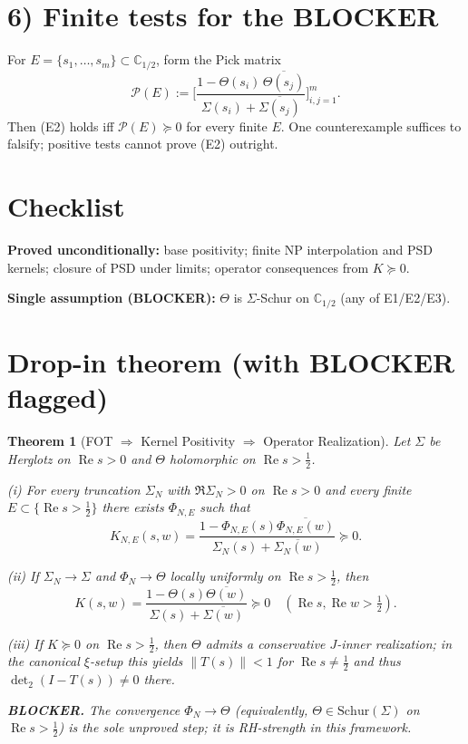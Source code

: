 \documentclass[11pt]{article}
\newcommand{\C}{\mathbb{C}}
\newcommand{\ReS}{\operatorname{Re}}
\newcommand{\Si}{\Sigma}
\newcommand{\SiN}{\Sigma_N}
\newcommand{\Th}{\Theta}
\newcommand{\detTwo}{\det\nolimits_{2}}
\theoremstyle{plain}
\newtheorem{theorem}{Theorem}
\theoremstyle{definition}
\theoremstyle{remark}
\begin{document}
\section*{6) Finite tests for the BLOCKER}
For $E=\{s_1,\dots,s_m\}\subset\C_{1/2}$, form the Pick matrix
\[
\mathcal P(E):=\Bigg[ \frac{1-\Th(s_i)\,\overline{\Th(s_j)}}{\Si(s_i)+\overline{\Si(s_j)}} \Bigg]_{i,j=1}^m.
\]
Then (E2) holds iff $\mathcal P(E)\succeq0$ for every finite $E$. One counterexample suffices to falsify; positive tests cannot prove (E2) outright.

\section*{Checklist}
\textbf{Proved unconditionally:} base positivity; finite NP interpolation and PSD kernels; closure of PSD under limits; operator consequences from $K\succeq0$.

\textbf{Single assumption (BLOCKER):} $\Th$ is $\Si$-Schur on $\C_{1/2}$ (any of E1/E2/E3).

\section*{Drop-in theorem (with BLOCKER flagged)}
\begin{theorem}[FOT $\Rightarrow$ Kernel Positivity $\Rightarrow$ Operator Realization]
Let $\Si$ be Herglotz on $\ReS s>0$ and $\Th$ holomorphic on $\ReS s>\tfrac12$.

(i) For every truncation $\SiN$ with $\Re\SiN>0$ on $\ReS s>0$ and every finite $E\subset\{\ReS s>\tfrac12\}$ there exists $\Phi_{N,E}$ such that
\[
K_{N,E}(s,w)=\frac{1-\Phi_{N,E}(s)\overline{\Phi_{N,E}(w)}}{\SiN(s)+\overline{\SiN(w)}}\succeq0.
\]

(ii) If $\SiN\to\Si$ and $\Phi_N\to\Th$ locally uniformly on $\ReS s>\tfrac12$, then
\[
K(s,w)=\frac{1-\Th(s)\overline{\Th(w)}}{\Si(s)+\overline{\Si(w)}}\succeq0 \quad(\ReS s,\ReS w>\tfrac12).
\]

(iii) If $K\succeq0$ on $\ReS s>\tfrac12$, then $\Th$ admits a conservative $J$-inner realization; in the canonical $\xi$-setup this yields $\|T(s)\|<1$ for $\ReS s\ne\tfrac12$ and thus $\detTwo(I-T(s))\ne0$ there.

\textbf{BLOCKER.} The convergence $\Phi_N\to\Th$ (equivalently, $\Th\in\mathrm{Schur}(\Si)$ on $\ReS s>\tfrac12$) is the sole unproved step; it is RH-strength in this framework.
\end{theorem}
\end{document}
